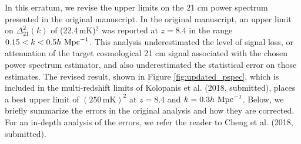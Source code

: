 \documentclass[onecolumn]{emulateapj} \shorttitle{}
\newcommand{\hMpci}{h\ {\rm Mpc}^{-1}}
\newcommand{\mKlimit}{(22.4\,\textrm{mK})$^2$ }
\newcommand{\revisedmklimit}{(250\,\textrm{mK})^2}
\newcommand{\kolopaniscitet}{Kolopanis et al. (2018, submitted)}
\newcommand{\chengcitet}{\textrm{Cheng et al. (2018, submitted)}}
\begin{document}
\maketitle

In this erratum, we revise the upper limits on the 21 cm power spectrum
presented in the original manuscript.  In the original manuscript, an upper
limit on $\Delta_{21}^2(k)$ of \mKlimit was reported at $z=8.4$ in the range
$0.15<k<0.5\hMpci$.  This analysis underestimated the level of signal loss, or attenuation of
the target cosmological 21 cm signal associated with the chosen power spectrum
estimator, and also underestimated the statistical error on those estimates.
The revised result, shown in Figure \ref{fig:updated_pspec}, which is included
in the multi-redshift limits of \kolopaniscitet, places a best upper limit of
$\revisedmklimit$ at $z=8.4$ and $k=0.3\hMpci$.  Below, we briefly
summarize the errors in the original analysis and how they are corrected. For
an in-depth analysis of the errors, we refer the reader to \chengcitet.
\end{document}
